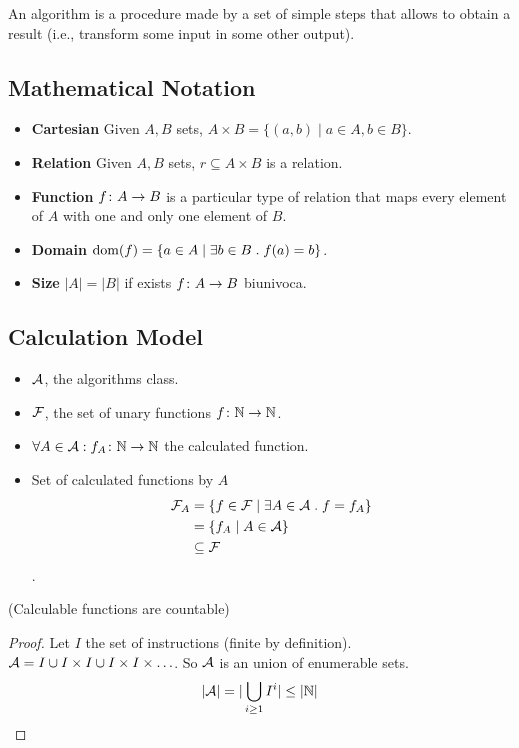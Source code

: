 \documentclass[12pt,a4paper,oneside]{book}
\begin{document}
An algorithm is a procedure made by a set of simple steps that allows
to obtain a result (i.e., transform some input in some other output).

\subsection{Mathematical Notation}

\begin{itemize}
    \item \textbf{Cartesian} Given $A, B$ sets, $A \times B = \{ (a,b)
      \mid a \in A, b \in B\}$.
    \item \textbf{Relation} Given $A, B$ sets, $r \subseteq A \times
      B$ is a relation.
    \item \textbf{Function} $\mathord{f}\colon A\to B$ is a particular type of
      relation that maps every element of $A$ with one and only one
      element of $B$.
    \item \textbf{Domain} $\mathop{\mathrm{dom}}\nolimits(f) = \{ a \in A \mid \exists b \in B
      \mathrel{.} f(a) = b \}$.
    \item \textbf{Size} $|A| = |B|$ if exists $\mathord{f}\colon A\to B$
      biunivoca.
\end{itemize}

\subsection{Calculation Model}

\begin{itemize}
    \item $\mathcal{A}$, the algorithms class.
    \item $\mathcal{F}$, the set of unary functions
      $\mathord{f}\colon\mathbb{N}\to\mathbb{N}$.
    \item $\forall A \in \mathcal{A} \mathrel{:} \mathord{f_A}\colon\mathbb{N}\to\mathbb{N}$ the
      calculated function.
    \item Set of calculated functions by $A$
    \begin{align*}
        \mathcal{F}_A &= \{ f \in \mathcal{F} \mid \exists A \in \mathcal{A} \mathrel{.} f = f_A \} \\ 
          &= \{ f_A \mid A \in \mathcal{A} \} \\
          &\subseteq \mathcal{F}
    \end{align*}.
\end{itemize}

\begin{lemma}{(Calculable functions are countable)}
    \begin{proof}
        Let $I$ the set of instructions (finite by definition). $\mathcal{A}
        = I \cup I \times I \cup I \times I \times \ldots$. So $\mathcal{A}$
        is an union of enumerable sets.
        \[
          |\mathcal{A}| = | \bigcup_{i \geq 1} I^i | \leq | \mathbb{N} |
        \]
    \end{proof}
\end{lemma}
\end{document}
